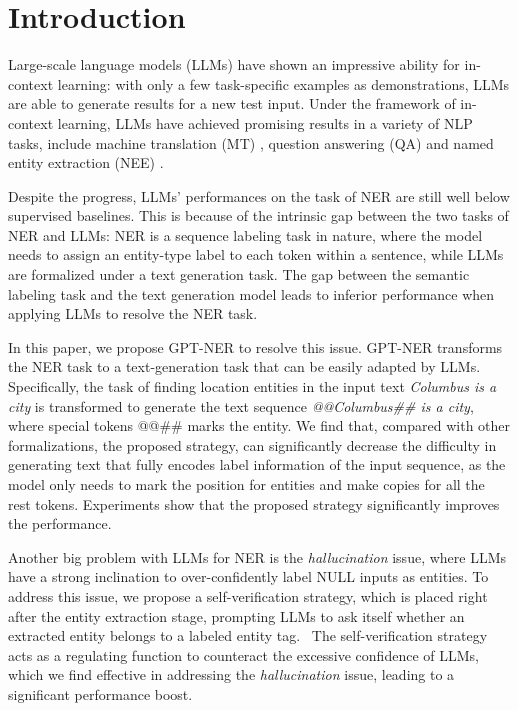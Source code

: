 \documentclass{article}
\begin{document}
\section{Introduction}
Large-scale language models (LLMs) \citep{brown2020language,smith2022using,du2022glam,rae2021scaling,thoppilan2022lamda,hoffmann2022training,chowdhery2022palm,touvron2023llama}
have shown an impressive ability for in-context learning:
with only a few task-specific examples as demonstrations, 
LLMs are able to generate results 
for a new test input. 
Under the framework of in-context learning, LLMs have achieved promising results in a variety of 
NLP tasks, include machine translation (MT) \citep{vilar2022prompting,vidal2022automatic,moslem2023adaptive}, question answering (QA) \citep{robinson2022leveraging,li2022self,lazaridou2022internet} and named entity extraction (NEE) \citep{chowdhery2022palm,brown2020language}.

Despite the progress, 
LLMs' performances on the task of NER 
are still well below supervised baselines. 
This is because of the intrinsic gap between the two tasks of  NER and LLMs:
NER is a sequence labeling task in nature, where the model needs to assign an entity-type label to each token within a sentence, while LLMs are formalized under a text generation task. 
The gap between the semantic labeling task and the text generation model leads to inferior performance when applying LLMs to resolve the NER task. 


In this paper, we propose GPT-NER to resolve this issue. 
GPT-NER transforms the NER task 
 to a text-generation task that can be easily adapted by 
  LLMs.
  Specifically, 
  the task of finding location entities in the input text {\it Columbus is a city}
is transformed to generate the text sequence 
\textit{@@Columbus\#\# is a city}, where special tokens @@\#\# marks the entity. 
We find
that, compared with other formalizations, 
 the proposed strategy,  
can  
 significantly decrease the difficulty in 
 generating text that 
   fully encodes label information of the input sequence, as the model only needs to mark the position for 
entities and make copies for all the rest tokens. 
Experiments show that the proposed strategy significantly improves the performance. 

Another big problem with LLMs for NER is 
 the {\it hallucination} issue, where LLMs have a strong inclination to over-confidently label NULL inputs as entities. 
To address this issue, we propose a self-verification strategy, which is placed right after the entity extraction stage,
prompting
 LLMs to 
 ask itself whether an extracted entity belongs to a labeled entity tag. 
  The self-verification strategy acts as a regulating function to counteract the excessive confidence of LLMs, 
  which we find effective in 
  addressing the 
{\it hallucination} issue, leading to a significant performance boost. 
\end{document}
